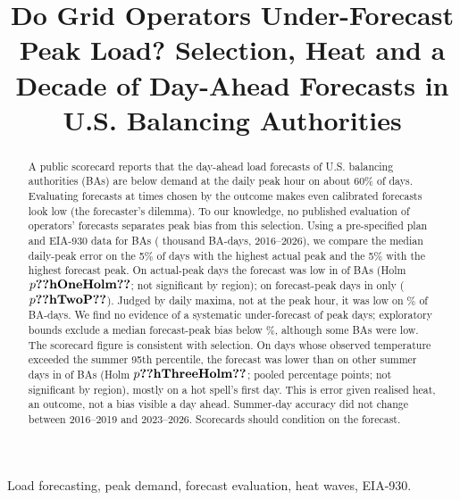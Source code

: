 \documentclass[conference,a4paper]{IEEEtran}
\begin{document}
\title{Do Grid Operators Under-Forecast Peak Load? Selection, Heat and a Decade of Day-Ahead Forecasts in U.S. Balancing Authorities}

\author{
}

\maketitle

\begin{abstract}
A public scorecard reports that the day-ahead load forecasts of U.S. balancing authorities (BAs) are below demand at the daily peak hour on about 60\% of days. Evaluating forecasts at times chosen by the outcome makes even calibrated forecasts look low (the forecaster's dilemma). To our knowledge, no published evaluation of operators' forecasts separates peak bias from this selection. Using a pre-specified plan and EIA-930 data for  BAs ( thousand BA-days, 2016--2026), we compare the median daily-peak error on the 5\% of days with the highest actual peak and the 5\% with the highest forecast peak. On actual-peak days the forecast was low in  of  BAs (Holm $p\res{hOneHolm}$; not significant by region); on forecast-peak days in only  ($p\res{hTwoP}$). Judged by daily maxima, not at the peak hour, it was low on \% of BA-days. We find no evidence of a systematic under-forecast of peak days; exploratory bounds exclude a median forecast-peak bias below \%, although some BAs were low. The scorecard figure is consistent with selection. On days whose observed temperature exceeded the summer 95th percentile, the forecast was lower than on other summer days in  of  BAs (Holm $p\res{hThreeHolm}$; pooled  percentage points; not significant by region), mostly on a hot spell's first day. This is error given realised heat, an outcome, not a bias visible a day ahead. Summer-day accuracy did not change between 2016--2019 and 2023--2026. Scorecards should condition on the forecast.
\end{abstract}

\begin{IEEEkeywords}
Load forecasting, peak demand, forecast evaluation, heat waves, EIA-930.
\end{IEEEkeywords}
\end{document}
